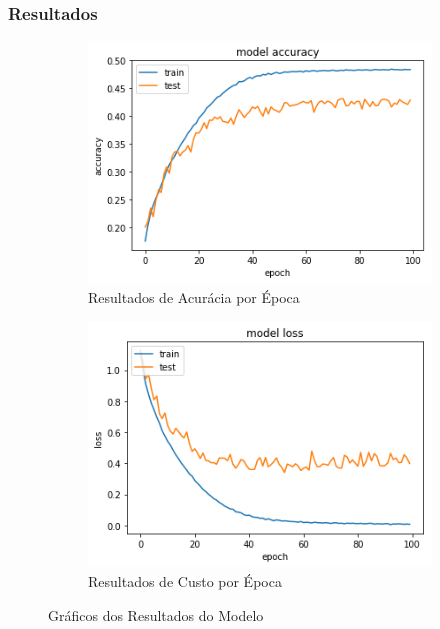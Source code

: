 \subsubsection{Resultados}

\begin{figure}[H]
  \centering
  \begin{subfigure}[b]{0.45\linewidth}
    \includegraphics[width=\linewidth]{img/enc-dec-5.png}
    \caption{Resultados de Acurácia por Época}
  \end{subfigure}
  \begin{subfigure}[b]{0.45\linewidth}
    \includegraphics[width=\linewidth]{img/enc-dec-5-loss.png}
    \caption{Resultados de Custo por Época}
  \end{subfigure}
  \caption{Gráficos dos Resultados do Modelo}
  \label{fig:plots5}
\end{figure}

